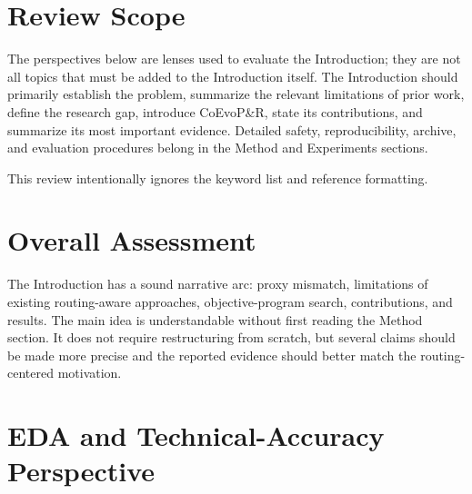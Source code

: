 \documentclass[11pt]{article}
\begin{document}
\section{Review Scope}

The perspectives below are lenses used to evaluate the Introduction; they are
not all topics that must be added to the Introduction itself. The Introduction
should primarily establish the problem, summarize the relevant limitations of
prior work, define the research gap, introduce CoEvoP\&R, state its
contributions, and summarize its most important evidence. Detailed safety,
reproducibility, archive, and evaluation procedures belong in the Method and
Experiments sections.

This review intentionally ignores the keyword list and reference formatting.

\section{Overall Assessment}

The Introduction has a sound narrative arc: proxy mismatch, limitations of
existing routing-aware approaches, objective-program search, contributions,
and results. The main idea is understandable without first reading the Method
section. It does not require restructuring from scratch, but several claims
should be made more precise and the reported evidence should better match the
routing-centered motivation.

\section{EDA and Technical-Accuracy Perspective}
\end{document}
